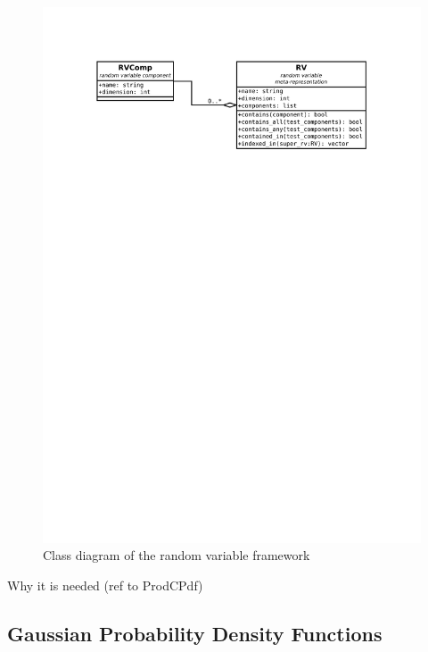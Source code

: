 \begin{figure}[h]
	\centering
	\includegraphics[width=\textwidth,keepaspectratio=true,clip=true,trim=3cm 218mm 3cm 3cm]{./diagrams/rvs.pdf}
	\vspace{-8mm}
	\caption{Class diagram of the random variable framework}
	\label{fig:DiaRvs}
\end{figure}

Why it is needed (ref to ProdCPdf)

\subsection{Gaussian Probability Density Functions}

